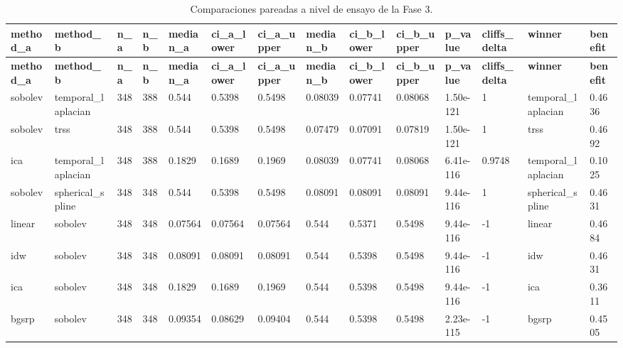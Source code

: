 \begin{landscape}
\scriptsize
\begin{longtable}{p{}p{}p{}p{}p{}p{}p{}p{}p{}p{}p{}p{}p{}p{}}
\caption{Comparaciones pareadas a nivel de ensayo de la Fase 3.}\label{tab:app_phase3_pairwise}\\
\toprule
\textbf{method\_a} & \textbf{method\_b} & \textbf{n\_a} & \textbf{n\_b} & \textbf{median\_a} & \textbf{ci\_a\_lower} & \textbf{ci\_a\_upper} & \textbf{median\_b} & \textbf{ci\_b\_lower} & \textbf{ci\_b\_upper} & \textbf{p\_value} & \textbf{cliffs\_delta} & \textbf{winner} & \textbf{benefit} \\
\midrule
\endfirsthead
\toprule
\textbf{method\_a} & \textbf{method\_b} & \textbf{n\_a} & \textbf{n\_b} & \textbf{median\_a} & \textbf{ci\_a\_lower} & \textbf{ci\_a\_upper} & \textbf{median\_b} & \textbf{ci\_b\_lower} & \textbf{ci\_b\_upper} & \textbf{p\_value} & \textbf{cliffs\_delta} & \textbf{winner} & \textbf{benefit} \\
\midrule
\endhead
sobolev & temporal\_laplacian & 348 & 388 & 0.544 & 0.5398 & 0.5498 & 0.08039 & 0.07741 & 0.08068 & 1.50e-121 & 1 & temporal\_laplacian & 0.4636 \\
sobolev & trss & 348 & 388 & 0.544 & 0.5398 & 0.5498 & 0.07479 & 0.07091 & 0.07819 & 1.50e-121 & 1 & trss & 0.4692 \\
ica & temporal\_laplacian & 348 & 388 & 0.1829 & 0.1689 & 0.1969 & 0.08039 & 0.07741 & 0.08068 & 6.41e-116 & 0.9748 & temporal\_laplacian & 0.1025 \\
sobolev & spherical\_spline & 348 & 348 & 0.544 & 0.5398 & 0.5498 & 0.08091 & 0.08091 & 0.08091 & 9.44e-116 & 1 & spherical\_spline & 0.4631 \\
linear & sobolev & 348 & 348 & 0.07564 & 0.07564 & 0.07564 & 0.544 & 0.5371 & 0.5498 & 9.44e-116 & -1 & linear & 0.4684 \\
idw & sobolev & 348 & 348 & 0.08091 & 0.08091 & 0.08091 & 0.544 & 0.5398 & 0.5498 & 9.44e-116 & -1 & idw & 0.4631 \\
ica & sobolev & 348 & 348 & 0.1829 & 0.1689 & 0.1969 & 0.544 & 0.5398 & 0.5498 & 9.44e-116 & -1 & ica & 0.3611 \\
bgsrp & sobolev & 348 & 348 & 0.09354 & 0.08629 & 0.09404 & 0.544 & 0.5398 & 0.5498 & 2.23e-115 & -1 & bgsrp & 0.4505 \\

\end{longtable}
\end{landscape}
